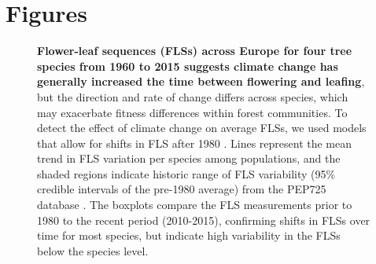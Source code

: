 \documentclass[11pt]{article}
\begin{document}
\section*{Figures}


\begin{figure}[h!]
    \centering
    \caption{\textbf{Flower-leaf sequences (FLSs) across Europe for four tree species from 1960 to 2015 suggests climate change has generally increased the time between flowering and leafing}, but the direction and rate of change differs across species, which may exacerbate fitness differences within forest communities. To detect the effect of climate change on average FLSs, we used models that allow for shifts in FLS after 1980 \citep{Kharouba2018}. Lines represent the mean trend in FLS variation per species among populations, and the shaded regions indicate historic range of FLS variability (95\% credible intervals of the pre-1980 average) from the PEP725 database \citep{PEP725}. The boxplots compare the FLS measurements prior to 1980 to the recent period (2010-2015), confirming shifts in FLSs over time for most species, but indicate high variability in the FLSs below the species level.}
    \label{fig:climchange}
\end{figure}
\end{document}
